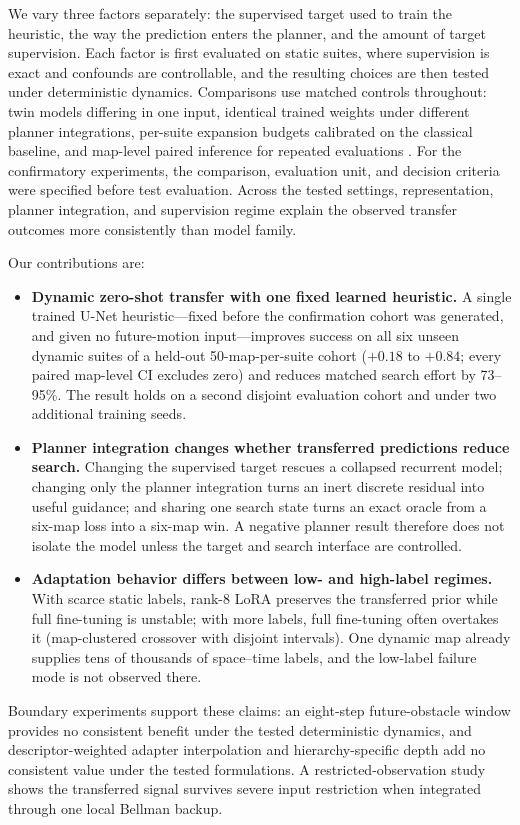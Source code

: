 \documentclass[letterpaper]{article} %
\begin{document}
We vary three factors separately: the supervised target used to train the heuristic, the way the prediction enters the planner, and the amount of target supervision. Each factor is first evaluated on static suites, where supervision is exact and confounds are controllable, and the resulting choices are then tested under deterministic dynamics. Comparisons use matched controls throughout: twin models differing in one input, identical trained weights under different planner integrations, per-suite expansion budgets calibrated on the classical baseline, and map-level paired inference for repeated evaluations \citep{henderson2018matters,agarwal2021precipice,pineau2021reproducibility}. For the confirmatory experiments, the comparison, evaluation unit, and decision criteria were specified before test evaluation. Across the tested settings, representation, planner integration, and supervision regime explain the observed transfer outcomes more consistently than model family.

Our contributions are:
\begin{itemize}
    \item \textbf{Dynamic zero-shot transfer with one fixed learned heuristic.} A single trained U-Net heuristic---fixed before the confirmation cohort was generated, and given no future-motion input---improves success on all six unseen dynamic suites of a held-out 50-map-per-suite cohort ($+0.18$ to $+0.84$; every paired map-level CI excludes zero) and reduces matched search effort by 73--95\%. The result holds on a second disjoint evaluation cohort and under two additional training seeds.
    \item \textbf{Planner integration changes whether transferred predictions reduce search.} Changing the supervised target rescues a collapsed recurrent model; changing only the planner integration turns an inert discrete residual into useful guidance; and sharing one search state turns an exact oracle from a six-map loss into a six-map win. A negative planner result therefore does not isolate the model unless the target and search interface are controlled.
    \item \textbf{Adaptation behavior differs between low- and high-label regimes.} With scarce static labels, rank-8 LoRA preserves the transferred prior while full fine-tuning is unstable; with more labels, full fine-tuning often overtakes it (map-clustered crossover with disjoint intervals). One dynamic map already supplies tens of thousands of space--time labels, and the low-label failure mode is not observed there.
\end{itemize}
Boundary experiments support these claims: an eight-step future-obstacle window provides no consistent benefit under the tested deterministic dynamics, and descriptor-weighted adapter interpolation and hierarchy-specific depth add no consistent value under the tested formulations. A restricted-observation study shows the transferred signal survives severe input restriction when integrated through one local Bellman backup.
\end{document}
